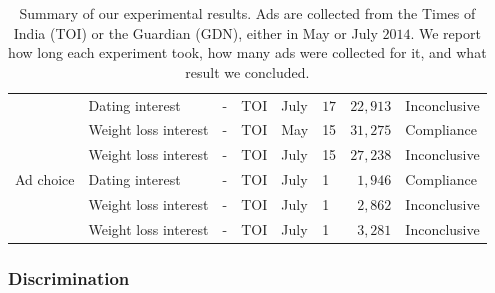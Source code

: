 \documentclass[10pt, onecolumn]{report}
\begin{document}
\begin{table}
\begin{tabular}{llL{1.5cm}llL{1cm}rl}
& Dating interest & - & TOI & July & $17$ & $22,913$  &  Inconclusive\\
& Weight loss interest & - & TOI & May & 15 & $31,275$  &  Compliance\\
& Weight loss interest & - & TOI & July & 15 & $27,238$  &  Inconclusive\\
\hline
Ad choice 
& Dating interest  & - & TOI & July & 1 & $1,946$   &  Compliance\\
& Weight loss interest  & - & TOI & July & 1 & $2,862$   &  Inconclusive\\
& Weight loss interest  & - & TOI & July & 1 & $3,281$   &   Inconclusive\\
\hline
\end{tabular}
\caption{%
Summary of our experimental results. %
Ads are collected from the Times of India (TOI) or the Guardian (GDN), 
either in May or July $2014$. 
We report how long each experiment took, how many ads were collected for it, and what result we concluded.
}
\label{tbl:results}
\end{table}

\subsubsection{Discrimination}
\end{document}
